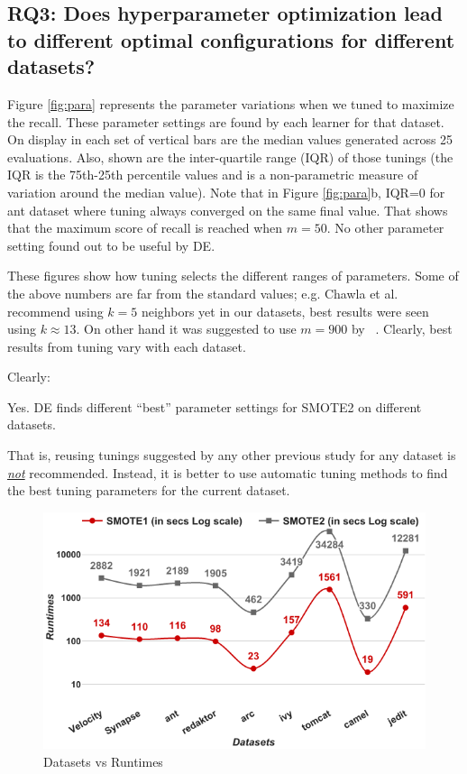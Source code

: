 
\subsection{\textbf{RQ3: Does hyperparameter optimization lead to different optimal configurations for different datasets?}}

Figure \ref{fig:para} represents the parameter variations when we tuned to maximize the recall. These parameter settings are found by each learner for that dataset.
On display in each set of vertical bars are
the median values generated across 25 evaluations.
Also, shown are
the inter-quartile range (IQR) of those tunings (the IQR is the 75th-25th percentile values and is a non-parametric measure of variation
around the median value). Note that in Figure \ref{fig:para}b, IQR=0 for  ant dataset where tuning always converged on the same final value. That shows that the maximum score of recall is reached when $m=50$. No other parameter setting found out to be useful by DE.

  These figures
show how tuning selects the different ranges  of
parameters.
Some of the above numbers are far from the standard values; e.g. Chawla et al.~\cite{chawla2002smote} recommend using $k=5$ neighbors yet in our datasets, best results were seen using $k \approx 13$. On other hand it was suggested to use $m=900$ by ~\cite{pears2014synthetic}.
Clearly,
best results from tuning
vary with each dataset.

Clearly:
\begin{lesson1}
    Yes. DE finds different ``best'' parameter settings for SMOTE2 on different datasets.
\end{lesson1}
 That is,  reusing tunings  suggested  by  any other  previous study  for any dataset is \underline{{\em not}} recommended. Instead,  it is better to
      use  automatic  tuning  methods  to find the best tuning parameters for the current dataset.

\begin{figure}[!htbp]
  \captionsetup{justification=centering}
  \includegraphics[width=\linewidth]{./fig/runtimes.png}
  \caption{Datasets vs Runtimes}
  \label{runtime}
\vspace{-0.7cm}
\end{figure}

